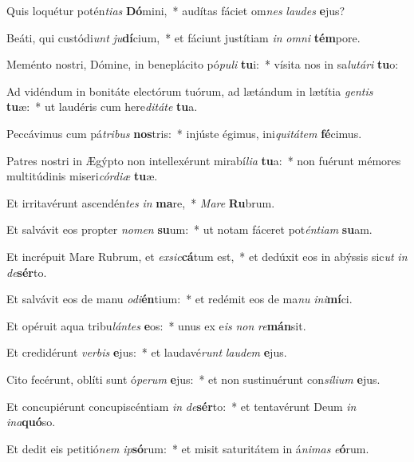 \item Quis loquétur potén\textit{ti}\textit{as} \textbf{Dó}mini,~* audítas fáciet om\textit{nes} \textit{lau}\textit{des} \textbf{e}jus?
\item Beáti, qui custódi\textit{unt} \textit{ju}\textbf{dí}cium,~* et fáciunt justítiam \textit{in} \textit{om}\textit{ni} \textbf{tém}pore.
\item Meménto nostri, Dómine, in beneplácito pó\textit{pu}\textit{li} \textbf{tu}i:~* vísita nos in sa\textit{lu}\textit{tá}\textit{ri} \textbf{tu}o:
\item Ad vidéndum in bonitáte electórum tuórum, ad lætándum in lætítia \textit{gen}\textit{tis} \textbf{tu}æ:~* ut laudéris cum here\textit{di}\textit{tá}\textit{te} \textbf{tu}a.
\item Peccávimus cum pá\textit{tri}\textit{bus} \textbf{nos}tris:~* injúste égimus, ini\textit{qui}\textit{tá}\textit{tem} \textbf{fé}cimus.
\item Patres nostri in Ægýpto non intellexérunt mirabí\textit{li}\textit{a} \textbf{tu}a:~* non fuérunt mémores multitúdinis miseri\textit{cór}\textit{di}\textit{æ} \textbf{tu}æ.
\item Et irritavérunt ascendén\textit{tes} \textit{in} \textbf{ma}re,~* \textit{Ma}\textit{re} \textbf{Ru}brum.
\item Et salvávit eos propter \textit{no}\textit{men} \textbf{su}um:~* ut notam fáceret pot\textit{én}\textit{ti}\textit{am} \textbf{su}am.
\item Et incrépuit Mare Rubrum, et \textit{ex}\textit{sic}\textbf{cá}tum est,~* et dedúxit eos in abýssis sic\textit{ut} \textit{in} \textit{de}\textbf{sér}to.
\item Et salvávit eos de manu \textit{o}\textit{di}\textbf{én}tium:~* et redémit eos de ma\textit{nu} \textit{in}\textit{i}\textbf{mí}ci.
\item Et opéruit aqua tribu\textit{lán}\textit{tes} \textbf{e}os:~* unus ex e\textit{is} \textit{non} \textit{re}\textbf{mán}sit.
\item Et credidérunt \textit{ver}\textit{bis} \textbf{e}jus:~* et laudavé\textit{runt} \textit{lau}\textit{dem} \textbf{e}jus.
\item Cito fecérunt, oblíti sunt ó\textit{pe}\textit{rum} \textbf{e}jus:~* et non sustinuérunt con\textit{sí}\textit{li}\textit{um} \textbf{e}jus.
\item Et concupiérunt concupiscéntiam \textit{in} \textit{de}\textbf{sér}to:~* et tentavérunt Deum \textit{in} \textit{in}\textit{a}\textbf{quó}so.
\item Et dedit eis petitió\textit{nem} \textit{ip}\textbf{só}rum:~* et misit saturitátem in á\textit{ni}\textit{mas} \textit{e}\textbf{ó}rum.
